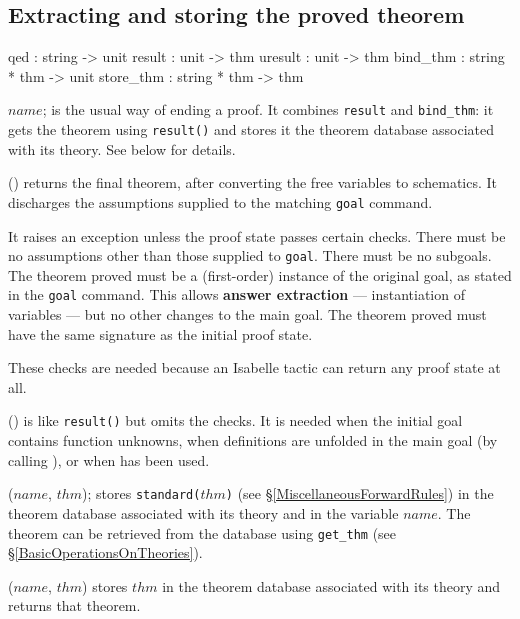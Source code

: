 \subsection{Extracting and storing the proved theorem}
\label{ExtractingAndStoringTheProvedTheorem}
\begin{ttbox} 
qed       : string -> unit
result    : unit -> thm
uresult   : unit -> thm
bind_thm  : string * thm -> unit
store_thm : string * thm -> thm
\end{ttbox}
\begin{ttdescription}
\item[\ttindexbold{qed} $name$;] is the usual way of ending a proof.
  It combines {\tt result} and {\tt bind_thm}: it gets the theorem
  using {\tt result()} and stores it the theorem database associated
  with its theory.  See below for details.

\item[\ttindexbold{result}()]
  returns the final theorem, after converting the free variables to
  schematics.  It discharges the assumptions supplied to the matching 
  {\tt goal} command.  

  It raises an exception unless the proof state passes certain checks.  There
  must be no assumptions other than those supplied to {\tt goal}.  There
  must be no subgoals.  The theorem proved must be a (first-order) instance
  of the original goal, as stated in the {\tt goal} command.  This allows
  {\bf answer extraction} --- instantiation of variables --- but no other
  changes to the main goal.  The theorem proved must have the same signature
  as the initial proof state.

  These checks are needed because an Isabelle tactic can return any proof
  state at all.

\item[\ttindexbold{uresult}()] is like {\tt result()} but omits the checks.
  It is needed when the initial goal contains function unknowns, when
  definitions are unfolded in the main goal (by calling
  ), or when
   has been used.
  
\item[\ttindexbold{bind_thm} ($name$, $thm$);]
  stores {\tt standard($thm$)} (see \S\ref{MiscellaneousForwardRules})
  in the theorem database associated with its theory and in the {\ML}
  variable $name$.  The theorem can be retrieved from the database
  using {\tt get_thm} (see \S\ref{BasicOperationsOnTheories}).
  
\item[\ttindexbold{store_thm} ($name$, $thm$)]
  stores $thm$ in the theorem database associated with its theory and
  returns that theorem.
\end{ttdescription}


